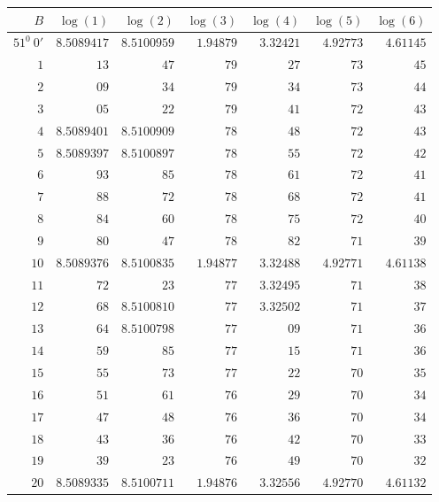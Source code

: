 \clearpage
{}
\begingroup
\fontsize{8}{9}\selectfont
\setlength{\tabcolsep}{5pt}
\renewcommand{\arraystretch}{1.09}
\begin{center}
\begin{tabular}{||r||r|r|r|r|r|r||}
\hline\hline
\(B\)&\(\log(1)\)&\(\log(2)\)&\(\log(3)\)&\(\log(4)\)&\(\log(5)\)&\(\log(6)\)\\
\hline
\(51^0\ 0'\) & \(8.5089417\) & \(8.5100959\) & \(1.94879\) & \(3.32421\) & \(4.92773\) & \(4.61145\)\\
\(1\) & \(13\) & \(47\) & \(79\) & \(27\) & \(73\) & \(45\)\\
\(2\) & \(09\) & \(34\) & \(79\) & \(34\) & \(73\) & \(44\)\\
\(3\) & \(05\) & \(22\) & \(79\) & \(41\) & \(72\) & \(43\)\\
\(4\) & \(8.5089401\) & \(8.5100909\) & \(78\) & \(48\) & \(72\) & \(43\)\\
\(5\) & \(8.5089397\) & \(8.5100897\) & \(78\) & \(55\) & \(72\) & \(42\)\\
\(6\) & \(93\) & \(85\) & \(78\) & \(61\) & \(72\) & \(41\)\\
\(7\) & \(88\) & \(72\) & \(78\) & \(68\) & \(72\) & \(41\)\\
\(8\) & \(84\) & \(60\) & \(78\) & \(75\) & \(72\) & \(40\)\\
\(9\) & \(80\) & \(47\) & \(78\) & \(82\) & \(71\) & \(39\)\\[3pt]
\(10\) & \(8.5089376\) & \(8.5100835\) & \(1.94877\) & \(3.32488\) & \(4.92771\) & \(4.61138\)\\
\(11\) & \(72\) & \(23\) & \(77\) & \(3.32495\) & \(71\) & \(38\)\\
\(12\) & \(68\) & \(8.5100810\) & \(77\) & \(3.32502\) & \(71\) & \(37\)\\
\(13\) & \(64\) & \(8.5100798\) & \(77\) & \(09\) & \(71\) & \(36\)\\
\(14\) & \(59\) & \(85\) & \(77\) & \(15\) & \(71\) & \(36\)\\
\(15\) & \(55\) & \(73\) & \(77\) & \(22\) & \(70\) & \(35\)\\
\(16\) & \(51\) & \(61\) & \(76\) & \(29\) & \(70\) & \(34\)\\
\(17\) & \(47\) & \(48\) & \(76\) & \(36\) & \(70\) & \(34\)\\
\(18\) & \(43\) & \(36\) & \(76\) & \(42\) & \(70\) & \(33\)\\
\(19\) & \(39\) & \(23\) & \(76\) & \(49\) & \(70\) & \(32\)\\[3pt]
\(20\) & \(8.5089335\) & \(8.5100711\) & \(1.94876\) & \(3.32556\) & \(4.92770\) & \(4.61132\)\\

\end{tabular}
\end{center}
